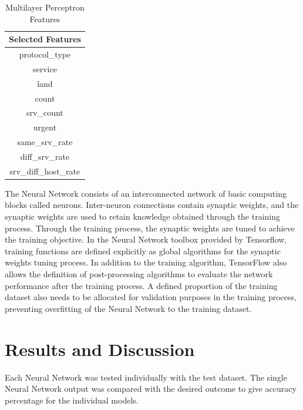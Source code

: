 \documentclass[12pt]{article}
\theoremstyle{definition}
\begin{document}
		\begin{table}[h!]
			\centering
			\caption{Multilayer Perceptron Features}
			\label{tab:model-1-features}
			\begin{tabular}{|c|}
				\hline
				\bfseries{Selected Features} \\ \hline
				protocol\_type \\
				service \\
				land \\
				count \\
				srv\_count \\
				urgent \\
				same\_srv\_rate \\
				diff\_srv\_rate \\
				srv\_diff\_host\_rate \\
				\hline	
			\end{tabular}
			
		\end{table}
		The Neural Network consists of an interconnected network of basic computing blocks called
		neurons. Inter-neuron connections contain synaptic weights, and the synaptic weights are
		used to retain knowledge obtained through the training process. Through the training
		process, the synaptic weights are tuned to achieve the training objective. In the Neural Network
		toolbox provided by Tensorflow, training functions are defined explicitly as global
		algorithms for the synaptic weights tuning process. In addition to the training algorithm,
		TensorFlow also allows the definition of post-processing algorithms to evaluate the
		network performance after the training process. A defined proportion of the training
		dataset also needs to be allocated for validation purposes in the training process,
		preventing overfitting of the Neural Network to the training dataset.
	
		
			
			
			
	
	\cleardoublepage
	\section{Results and Discussion}
	Each Neural Network was tested individually with the test dataset. The single Neural Network output was compared with the desired outcome to give accuracy percentage for the individual models.
		
\end{document}
